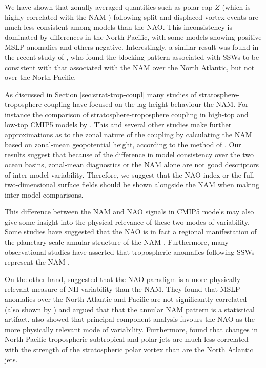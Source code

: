 We have shown that zonally-averaged quantities such as polar cap $Z$ (which is
highly correlated with the NAM \citep{Kushner2010}) following split and
displaced vortex events are much less consistent among models than the NAO. This
inconsistency is dominated by differences in the North Pacific, with some models
showing positive MSLP anomalies and others negative. Interestingly, a similar
result was found in the recent study of \citet{Davini2014}, who found the
blocking pattern associated with SSWs to be consistent with that associated with
the NAM over the North Atlantic, but not over the North Pacific. 

As discussed in Section \ref{sec:strat-trop-coupl} many studies of
stratosphere-troposphere coupling have focused on the lag-height behaviour the
NAM. For instance the comparison of stratosphere-troposphere coupling in
high-top and low-top CMIP5 models by \citet{Charlton-Perez2013}. This and
several other studies make further approximations as to the zonal nature of the
coupling by calculating the NAM based on zonal-mean geopotential height,
according to the method of \citet{Baldwin2009}. Our results suggest that because
of the difference in model consistency over the two ocean basins, zonal-mean
diagnostics or the NAM alone are not good descriptors of inter-model
variability. Therefore, we suggest that the NAO index or the full
two-dimensional surface fields should be shown alongside the NAM when making
inter-model comparisons.

This difference between the NAM and NAO signals in CMIP5 models may also give
some insight into the physical relevance of these two modes of variability. Some
studies have suggested that the NAO is in fact a regional manifestation of the
planetary-scale annular structure of the NAM \citep[e.g.,][]{Thompson1998,
  Wallace2002}. Furthermore, many observational studies have asserted that
tropospheric anomalies following SSWs represent the NAM
\citep[e.g.,][]{Baldwin1999,Baldwin2001a,Thompson2000}. 

On the other hand, \citet{Ambaum2001} suggested that the NAO paradigm is a more
physically relevant measure of NH variability than the NAM. They found that MSLP
anomalies over the North Atlantic and Pacific are not significantly correlated
(also shown by \citet{Deser2000}) and argued that that the annular NAM pattern
is a statistical artifact. \citet{Huth2006} also showed that principal component
analysis favours the NAO as the more physically relevant mode of
variability. Furthermore, \citet{Ambaum2002} found that changes in North Pacific
tropospheric subtropical and polar jets are much less correlated with the
strength of the stratospheric polar vortex than are the North Atlantic jets.

